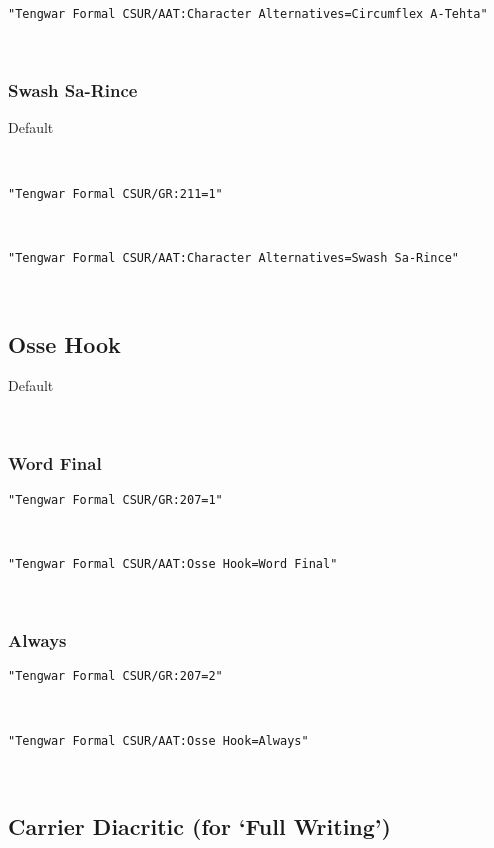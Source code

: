 \documentclass[11pt,a4paper]{article}
\begin{document}
\noindent \texttt{"Tengwar Formal CSUR/AAT:Character Alternatives=Circumflex A-Tehta"}

\formalAATcircumflex  \normalfont



\subsubsection{Swash Sa-Rince}


Default

\formalGR 

\noindent\texttt{"Tengwar Formal CSUR/GR:211=1"}

\formalGRswash 

\noindent \texttt{"Tengwar Formal CSUR/AAT:Character Alternatives=Swash Sa-Rince"}

\formalAATswash  \normalfont



\subsection{Osse Hook}


Default

\formalGR  \normalfont



\subsubsection*{Word Final}


\texttt{"Tengwar Formal CSUR/GR:207=1"}

\formalGRossefinal 

\noindent \texttt{"Tengwar Formal CSUR/AAT:Osse Hook=Word Final"}

\formalAATossefinal 



\subsubsection*{Always}


\texttt{"Tengwar Formal CSUR/GR:207=2"}

\formalGRossealways 

\noindent \texttt{"Tengwar Formal CSUR/AAT:Osse Hook=Always"}

\formalAATossealways  \normalfont



\subsection{Carrier Diacritic (for ‘Full Writing’)}
\end{document}

